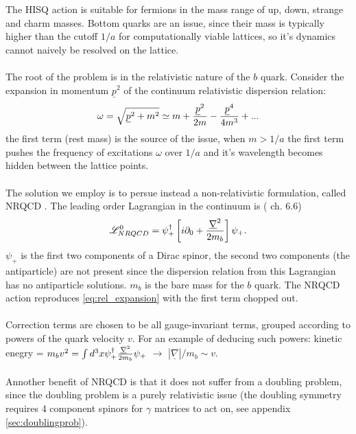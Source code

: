 \documentclass[a4paper,10pt]{article}
\numberwithin{equation}{section}
\begin{document}
The HISQ action is suitable for fermions in the mass range of up, down, strange and charm masses. Bottom quarks are an issue, since their mass is typically higher than the cutoff $1/a$ for computationally viable lattices, so it's dynamics cannot naively be resolved on the lattice.
\\ \\
The root of the problem is in the relativistic nature of the $b$ quark. Consider the expansion in momentum $\underline{p}^2$ of the continuum relativistic dispersion relation:
\begin{align}
	\omega = \sqrt{\underline{p}^2 + m^2} \simeq m + {\underline{p}^2\over 2m} - {\underline{p}^4\over 4m^3} + ...
	\label{eq:rel_expansion}
\end{align}
the first term (rest mass) is the source of the issue, when $m > 1/a$ the first term pushes the frequency of excitations $\omega$ over $1/a$ and it's wavelength becomes hidden between the lattice points. 
\\ \\
The solution we employ is to persue instead a non-relativistic formulation, called NRQCD \cite{Lepage:1992tx}. The leading order Lagrangian in the continuum is (\cite{DeGrand:2006zz} ch. 6.6)
\begin{align}
	\mathscr{L}^0_{NRQCD} = \psi^{\dagger}_+ \left[ i\partial_0 + {\underline{\nabla}^2\over 2m_b} \right] \psi_+.
\end{align}
$\psi_+$ is the first two components of a Dirac spinor, the second two components (the antiparticle) are not present since the dispersion relation from this Lagrangian has no antiparticle solutions.
$m_b$ is the bare mass for the $b$ quark. The NRQCD action reproduces \eqref{eq:rel_expansion} with the first term chopped out.
\\ \\
Correction terms are chosen to be all gauge-invariant terms, grouped according to powers of the quark velocity $v$. For an example of deducing such powers: 
kinetic enegry = $m_b v^2 = \int d^3x \psi_+^{\dagger} {\underline{\nabla}^2\over 2m_b} \psi_+$ $\rightarrow$ $|\underline{\nabla}|/m_b \sim v$.
\\ \\
Annother benefit of NRQCD is that it does not suffer from a doubling problem, since the doubling problem is a purely relativistic issue (the doubling symmetry requires 4 component spinors for $\gamma$ matrices to act on, see appendix \ref{sec:doublingprob}). 
\\ \\
\end{document}
